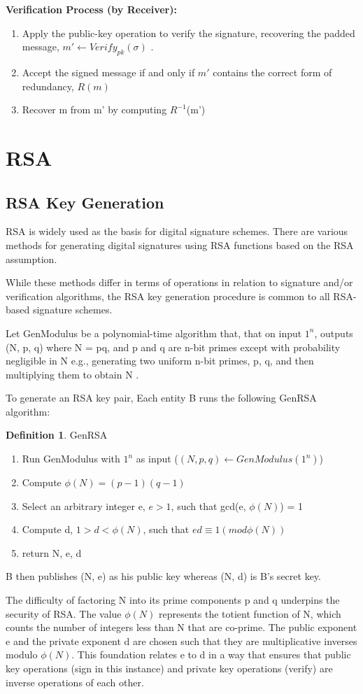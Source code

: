 \documentclass[]{final_report}
\theoremstyle{definition}
\newtheorem{definition}{Definition}[chapter]
\begin{document}
\textbf{Verification Process (by Receiver):}
\begin{enumerate}
    \item Apply the public-key operation to verify the signature, recovering the padded message,  \( m' \leftarrow Verify_{pk}(\sigma) \) .
    \item Accept the signed message if and only if \( m' \) contains the correct form of redundancy, \( R(m) \) 
    \item Recover m from m' by computing $R^{-1}$(m') 
\end{enumerate}


\section{RSA}
\subsection{RSA Key Generation}
RSA is widely used as the basis for digital signature schemes. There are various methods for generating digital signatures using RSA functions based on the RSA assumption. 


While these methods differ in terms of operations in relation to signature and/or verification algorithms, the RSA key generation procedure is common to all RSA-based signature schemes. 

Let GenModulus be a polynomial-time algorithm that, that on input $1^n$, outputs (N, p, q) where N = pq, and p and q are n-bit primes except with probability negligible in N e.g.,  generating two uniform n-bit primes,  p, q, and then multiplying them to obtain N .


To generate an RSA key pair, Each entity B runs the following GenRSA algorithm:

\begin{definition} GenRSA 
\begin{enumerate}
    \item Run GenModulus with $1^n$ as input ($(N, p, q) \leftarrow GenModulus(1^n)$)
    \item Compute $\phi(N) = (p - 1)(q - 1)$
    \item Select an arbitrary integer e, $e > 1$, such that gcd(e, $\phi(N)$) = 1 
    \item Compute d, $1 > d < \phi(N)$, such that $ed \equiv 1 (mod \phi(N))$
    \item return N, e, d
\end{enumerate}

B then publishes (N, e) as his public key whereas (N, d) is B's secret key.

\end{definition}
The difficulty of factoring N into its prime components p and q underpins the security of RSA. The value $\phi(N)$ represents the totient function of N, which counts the number of integers less than N that are co-prime.
The public exponent e and the private exponent d are chosen such that they are multiplicative inverses modulo $\phi(N)$. This foundation relates e to d in a way that ensures that public key operations (sign in this instance) and private key operations (verify) are inverse operations of each other.
\end{document}
